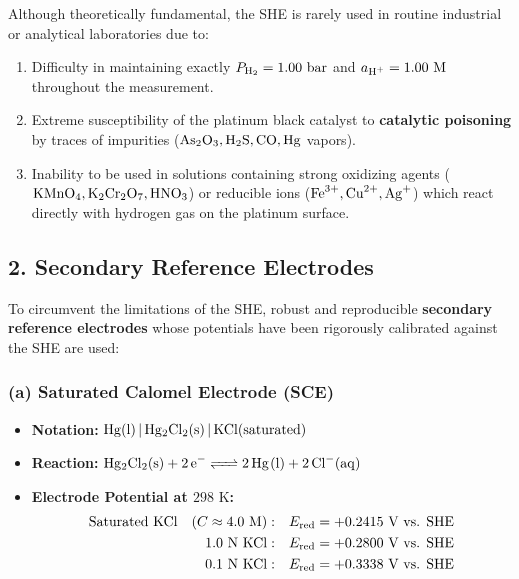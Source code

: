 \begin{conceptbox}
Although theoretically fundamental, the SHE is rarely used in routine industrial or analytical laboratories due to:
\begin{enumerate}[leftmargin=*]
    \item Difficulty in maintaining exactly $P_{\ce{H2}} = 1.00\text{ bar}$ and $a_{\ce{H+}} = 1.00\text{ M}$ throughout the measurement.
    \item Extreme susceptibility of the platinum black catalyst to \textbf{catalytic poisoning} by traces of impurities ($\ce{As2O3}, \ce{H2S}, \ce{CO}, \ce{Hg}$ vapors).
    \item Inability to be used in solutions containing strong oxidizing agents ($\ce{KMnO4}, \ce{K2Cr2O7}, \ce{HNO3}$) or reducible ions ($\ce{Fe^3+}, \ce{Cu^2+}, \ce{Ag+}$) which react directly with hydrogen gas on the platinum surface.
\end{enumerate}
\end{conceptbox}

\subsection{2. Secondary Reference Electrodes}
To circumvent the limitations of the SHE, robust and reproducible \textbf{secondary reference electrodes} whose potentials have been rigorously calibrated against the SHE are used:

\subsubsection{(a) Saturated Calomel Electrode (SCE)}
\begin{itemize}[leftmargin=*]
    \item \textbf{Notation:} $\ce{Hg(l) | Hg2Cl2(s) | KCl(saturated)}$
    \item \textbf{Reaction:} $\ce{Hg2Cl2(s) + 2e^- <=> 2Hg(l) + 2Cl^-(aq)}$
    \item \textbf{Electrode Potential at $298\text{ K}$:}
    \begin{align*}
        \text{Saturated } \ce{KCl} \quad (C \approx 4.0\text{ M}): \quad & E_{\text{red}} = +0.2415\text{ V vs. SHE} \\
        1.0\text{ N } \ce{KCl}: \quad & E_{\text{red}} = +0.2800\text{ V vs. SHE} \\
        0.1\text{ N } \ce{KCl}: \quad & E_{\text{red}} = +0.3338\text{ V vs. SHE}
    \end{align*}
\end{itemize}

